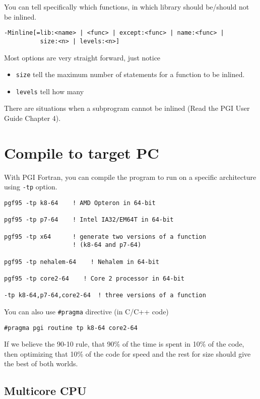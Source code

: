 You can tell specifically which functions, in which library should
be/should not be inlined.

\begin{verbatim}
-Minline[=lib:<name> | <func> | except:<func> | name:<func> | 
          size:<n> | levels:<n>]
\end{verbatim}
Most options are very straight forward, just notice
\begin{itemize}
\item  \verb!size! tell
the maximum number of statements for a function to be inlined. 
\item \verb!levels! tell how many 
\end{itemize}


There are situations when a subprogram cannot be inlined (Read the PGI
User Guide Chapter 4). 

\section{Compile to target PC}
\label{sec:compile-target-pc}

With PGI Fortran, you can compile the program to run on a specific
architecture using \verb!-tp! option.
\begin{verbatim}
pgf95 -tp k8-64    ! AMD Opteron in 64-bit

pgf95 -tp p7-64    ! Intel IA32/EM64T in 64-bit

pgf95 -tp x64      ! generate two versions of a function
                   ! (k8-64 and p7-64)

pgf95 -tp nehalem-64    ! Nehalem in 64-bit

pgf95 -tp core2-64    ! Core 2 processor in 64-bit

-tp k8-64,p7-64,core2-64  ! three versions of a function
\end{verbatim}

You can also use \verb!#pragma! directive (in C/C++ code)
\begin{verbatim}
#pragma pgi routine tp k8-64 core2-64
\end{verbatim}

If we believe the 90-10 rule, that 90\% of the time is spent in 10\%
of the code, then optimizing that 10\% of the code for speed and the
rest for size should give the best of both worlds.

\subsection{Multicore CPU}
\label{sec:multicore-cpu}

